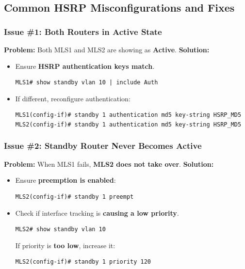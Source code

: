 \documentclass[a4paper]{book}
\begin{document}
\subsection{Common HSRP Misconfigurations and Fixes}

\subsubsection{Issue \#1: Both Routers in Active State}
\textbf{Problem:} Both MLS1 and MLS2 are showing as \textbf{Active}.  
\textbf{Solution:}
\begin{itemize}
\item Ensure \textbf{HSRP authentication keys match}.
\begin{lstlisting}
MLS1# show standby vlan 10 | include Auth
\end{lstlisting}
\item If different, reconfigure authentication:
\begin{lstlisting}
MLS1(config-if)# standby 1 authentication md5 key-string HSRP_MD5
MLS2(config-if)# standby 1 authentication md5 key-string HSRP_MD5
\end{lstlisting}
\end{itemize}

\subsubsection{Issue \#2: Standby Router Never Becomes Active}
\textbf{Problem:} When MLS1 fails, \textbf{MLS2 does not take over}.  
\textbf{Solution:}
\begin{itemize}
\item Ensure \textbf{preemption is enabled}:
\begin{lstlisting}
MLS2(config-if)# standby 1 preempt
\end{lstlisting}
\item Check if interface tracking is \textbf{causing a low priority}.
\begin{lstlisting}
MLS2# show standby vlan 10
\end{lstlisting}
If priority is \textbf{too low}, increase it:
\begin{lstlisting}
MLS2(config-if)# standby 1 priority 120
\end{lstlisting}
\end{itemize}
\end{document}
